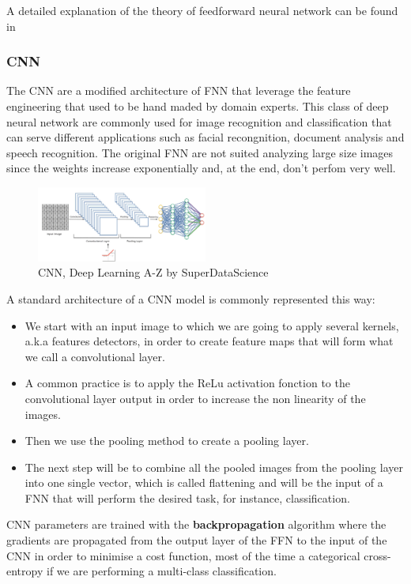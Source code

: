 \documentclass[letter,8pt]{article}\usepackage[]{graphicx}\usepackage[]{color}
\begin{document}
A detailed explanation of the theory of feedforward neural network can be found in \cite[Chapter 6]{Goodfellow-et-al-2016}

\subsubsection{CNN}

The CNN are a modified architecture of FNN that leverage the feature engineering that used to be hand maded by domain experts. This class of deep neural network are commonly used for image recognition and classification that can serve different applications such as facial recongnition, document analysis and speech recognition. The original FNN are not suited analyzing large size images since the weights increase exponentially and, at the end, don't perfom very well.\\
\begin{figure}
  \begin{center}
    \includegraphics[width=0.5\textwidth]{figure/CNN_process.png}
  \end{center}
  \caption{CNN, Deep Learning A-Z by SuperDataScience}
\end{figure}
A standard architecture of a CNN model is commonly represented this way:
\begin{itemize}
\item We start with an input image to which we are going to apply several kernels, a.k.a features detectors, in order to create feature maps that will form what we call a convolutional layer. 
\item A common practice is to apply the ReLu activation fonction to the convolutional layer output in order to increase the non linearity of the images.
\item Then we use the pooling method to create a pooling layer.
\item The next step will be to combine all the pooled images from the pooling layer into one single vector, which is called flattening and will be the input of a FNN that will perform the desired task, for instance, classification. 
\end{itemize}
CNN parameters are trained with the \textbf{backpropagation} algorithm where the gradients are propagated from the output layer of the FFN to the input of the CNN in order to minimise a cost function, most of the time a categorical cross-entropy if we are performing a multi-class classification. 
\end{document}
